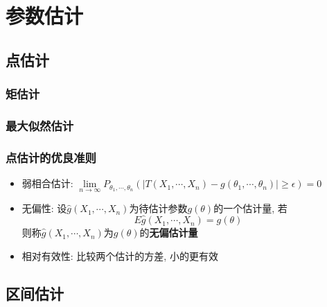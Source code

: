 \documentclass[UTF8]{article}
\begin{document}
\section{参数估计}
\subsection{点估计}
\subsubsection{矩估计}
\subsubsection{最大似然估计}
\subsubsection{点估计的优良准则}
\begin{itemize}
\item 弱相合估计: $\lim\limits_{n\rightarrow\infty}P_{\theta_1,\cdots,\theta_n}(\left|T(X_1,\cdots,X_n)-g(\theta_1,\cdots, \theta_n)\right|\ge\epsilon)=0$
\item 无偏性: 设$\hat{g}(X_1,\cdots,X_n)$为待估计参数$g(\theta)$的一个估计量, 若$$E\hat{g}(X_1,\cdots,X_n)=g(\theta)$$则称$\hat{g}(X_1,\cdots,X_n)$为$g(\theta)$的\textbf{无偏估计量}
\item 相对有效性: 比较两个估计的方差, 小的更有效
\end{itemize}
\subsection{区间估计}
\end{document}
